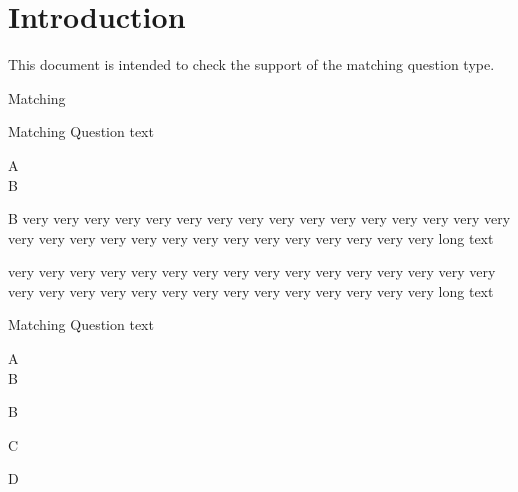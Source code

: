 \documentclass{article}
\begin{document}
\section*{Introduction}

This document is intended to check the support of the matching question 
type.

\begin{quiz}{Matching}

\begin{matching}[dd]{Matching}
Question text
\item A\\B {}
\item B \answer very very very very very very very very very very very very 
very very very very very very very very very very very very very very very very 
very very long text 
\item very very very very very very very very very very very very 
very very very very very very very very very very very very very very very very 
very very long text 
\item   {}
\end{matching}

\begin{matching}[shuffle=false]{Matching}
Question text
\item A\\B {}
\item B 
\item C 
\item D 
\item   {}
\end{matching}

\end{quiz}
\end{document}
